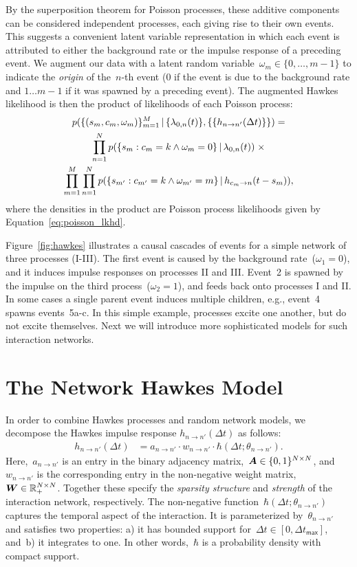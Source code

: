 By the superposition theorem for Poisson processes, these additive
components can be considered independent processes, each giving rise
to their own events.  This suggests a convenient latent variable
representation in which each event is attributed to either the
background rate or the impulse response of a preceding event.  We
augment our data with a latent random
variable~${\omega_m \in\{0,\ldots, m-1\}}$ to indicate the \emph{origin} of
the~$n$-th event ($0$ if the event is due to the background rate and
${1\ldots m-1}$ if it was spawned by a preceding event). The augmented
Hawkes likelihood is then the product of likelihoods of each Poisson
process:
\begin{multline*}
p(\{(s_m,c_m,\omega_m)\}_{m=1}^M \,|\, \{\lambda_{0,n}(t)\}, \{\{h_{n \to n'}(\Delta t)\}\}) = \\
\prod_{n=1}^N p(\{s_{m}: c_{m}=k \wedge \omega_{m}=0\} \,|\, \lambda_{0,n}(t))\;\times\\
\prod_{m=1}^M \prod_{n=1}^N p(\{s_{m'}: c_{m'}=k \wedge \omega_{m'}=m\} \,|\, h_{c_m \to n}(t-s_m)),
\end{multline*}
where the densities in the product are Poisson process likelihoods
given by Equation~\ref{eq:poisson_lkhd}.

Figure~\ref{fig:hawkes} illustrates a causal cascades of events for a
simple network of three processes (I-III).  The first event is caused
by the background rate~(${\omega_1=0}$), and it induces impulse responses
on processes II and III. Event~2 is spawned by the impulse on the
third process~(${\omega_2=1}$), and feeds back onto processes I and II. In
some cases a single parent event induces multiple children, e.g.,
event~4 spawns events~{5a-c}. In this simple example, processes excite
one another, but do not excite themselves. Next we will introduce more
sophisticated models for such interaction networks.

\section{The Network Hawkes Model}\label{sec:basic_model}
In order to combine Hawkes processes and random network models, we
decompose the Hawkes impulse response $h_{n \to n'}(\Delta t)$ as
follows:
\begin{align}
\label{eq:ir_decomp}
h_{n \to n'}(\Delta t) &= a_{n \to n'} \cdot w_{n \to n'} \cdot \hbar(\Delta t; \theta_{n \to n'}).
\end{align}
Here,~$a_{n \to n'}$ is an entry in the binary adjacency
matrix,~${\boldsymbol{A}\in\{0,1\}^{N \times N}}$,
and~$w_{n \to n'}$ is the corresponding entry in the non-negative
weight matrix,~${\boldsymbol{W} \in\mathbb{R}_+^{N\times N}}$. Together these specify
the \emph{sparsity structure} and \emph{strength} of the interaction
network, respectively. The non-negative function~${\hbar(\Delta t;
  \theta_{n \to n'})}$ captures the temporal aspect of the
interaction. It is parameterized by~${\theta_{n \to n'}}$ and
satisfies two properties: a) it has bounded support for~${\Delta t \in
  [0,\Delta t_{\mathsf{max}}]}$, and~b) it integrates to one. In other
words,~$\hbar$ is a probability density with compact support.

